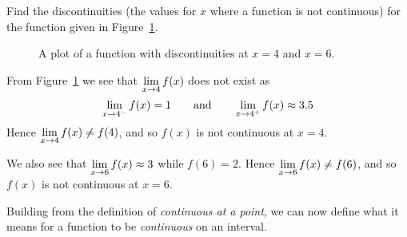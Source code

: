 \begin{example}
    Find the discontinuities (the values for $x$ where a function is not
continuous) for the function given in Figure~\ref{plot:discontinuous-function}. \cite{mooc}
    \begin{figure}[H]
        \centering
        \caption{A plot of a function with discontinuities at $x=4$ and $x=6$. \cite{mooc}}
        \label{plot:discontinuous-function}
    \end{figure}
    \begin{solution}
        From Figure~\ref{plot:discontinuous-function} we see that $\displaystyle\lim\limits_{x\to 4} f(x)$ does not exist as
        \[
        \displaystyle\lim\limits_{x\to 4^-}f(x) = 1\qquad\text{and}\qquad \displaystyle\lim\limits_{x\to 4^+}f(x) \approx 3.5
        \]
        Hence $\displaystyle\lim\limits_{x\to 4} f(x) \ne f(4)$, and so $f(x)$ is not
        continuous at $x=4$.
        
        We also see that $\displaystyle\lim\limits_{x\to 6} f(x) \approx 3$ while $f(6) =
        2$. Hence $\displaystyle\lim\limits_{x\to 6} f(x) \ne f(6)$, and so $f(x)$ is not
        continuous at $x=6$.
    \end{solution}
\end{example}

Building from the definition of \textit{continuous at a point}, we can now define what it means for a function to be \textit{continuous} on an interval. \cite{mooc}

